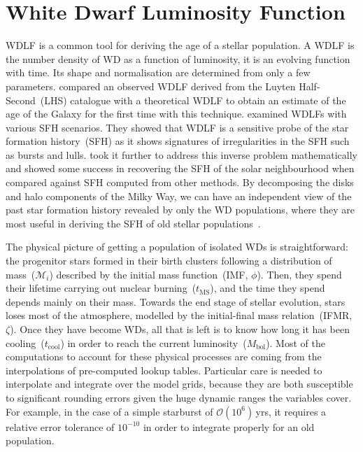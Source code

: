 \documentclass[fleqn,usenatbib]{mnras}
\begin{document}
\section{White Dwarf Luminosity Function}
WDLF is a common tool for deriving the age of a stellar population. A WDLF is
the number density of WD as a function of luminosity, it is an evolving
function with time. Its shape and normalisation are determined from only a few
parameters. \citet{1987ApJ...315L..77W} compared an observed WDLF derived from
the Luyten Half-Second~(LHS) catalogue with a theoretical WDLF to obtain an
estimate of the age of the Galaxy for the first time with this technique.
\citet{1990ApJ...352..605N} examined WDLFs with various SFH scenarios. They
showed that WDLF is a sensitive probe of the star formation history~(SFH) as
it shows signatures of irregularities in the SFH such as bursts and lulls.
\citet{2013MNRAS.434.1549R} took it further to address this inverse problem
mathematically and showed some success in recovering the SFH of the solar
neighbourhood when compared against SFH computed from other methods. By
decomposing the disks and halo components of the Milky Way, we can have an
independent view of the past star formation history revealed by only the
WD populations, where they are most useful in deriving the SFH of old
stellar populations~\citep{2011MNRAS.417...93R, 2017ASPC..509...25L}.


The physical picture of getting a population of isolated WDs is
straightforward: the progenitor stars formed in their birth clusters
following a distribution of mass~($\mathcal{M}_i$) described by the initial
mass function~(IMF, $\phi$). Then, they spend their lifetime carrying out
nuclear burning~($t_{\mathrm{MS}}$), and the time they spend depends mainly
on their mass. Towards the end stage of stellar evolution, stars loses most
of the atmosphere, modelled by the initial-final mass relation~(IFMR,
$\zeta$). Once they have become WDs, all that is left is to know how long it
has been cooling~($t_{\mathrm{cool}}$) in order to reach the current
luminosity~($M_\mathrm{bol}$). Most of the computations to account for these
physical processes are coming from the interpolations of pre-computed lookup
tables. Particular care is needed to interpolate and integrate over the
model grids, because they are both susceptible to significant rounding
errors given the huge dynamic ranges the variables cover. For example, in
the case of a simple starburst of $\mathcal{O}(10^6)$\,yrs, it requires a
relative error tolerance of $10^{-10}$ in order to integrate properly for
an old population.
\end{document}
